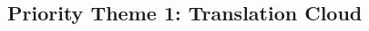 \documentclass[10pt, plain]{../../metanetpaper}
\begin{document}
\begin{multicols}{2}

\subsection{Priority Theme 1: Translation Cloud}
\label{sec:priority-theme-1-translation-cloud}


\end{multicols}
\end{document}
